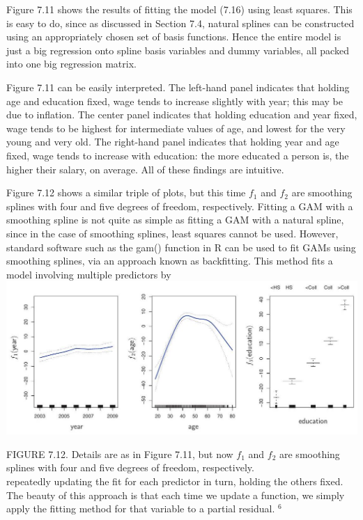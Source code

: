 \documentclass[10pt]{article}
\begin{document}
Figure 7.11 shows the results of fitting the model (7.16) using least squares. This is easy to do, since as discussed in Section 7.4, natural splines can be constructed using an appropriately chosen set of basis functions. Hence the entire model is just a big regression onto spline basis variables and dummy variables, all packed into one big regression matrix.

Figure 7.11 can be easily interpreted. The left-hand panel indicates that holding age and education fixed, wage tends to increase slightly with year; this may be due to inflation. The center panel indicates that holding education and year fixed, wage tends to be highest for intermediate values of age, and lowest for the very young and very old. The right-hand panel indicates that holding year and age fixed, wage tends to increase with education: the more educated a person is, the higher their salary, on average. All of these findings are intuitive.

Figure 7.12 shows a similar triple of plots, but this time $f_{1}$ and $f_{2}$ are smoothing splines with four and five degrees of freedom, respectively. Fitting a GAM with a smoothing spline is not quite as simple as fitting a GAM with a natural spline, since in the case of smoothing splines, least squares cannot be used. However, standard software such as the gam() function in R can be used to fit GAMs using smoothing splines, via an approach known as backfitting. This method fits a model involving multiple predictors by\\
\includegraphics[max width=\textwidth, center]{2025_05_05_efe77898333945044de4g-300}

FIGURE 7.12. Details are as in Figure 7.11, but now $f_{1}$ and $f_{2}$ are smoothing splines with four and five degrees of freedom, respectively.\\
repeatedly updating the fit for each predictor in turn, holding the others fixed. The beauty of this approach is that each time we update a function, we simply apply the fitting method for that variable to a partial residual. ${ }^{6}$
\end{document}
